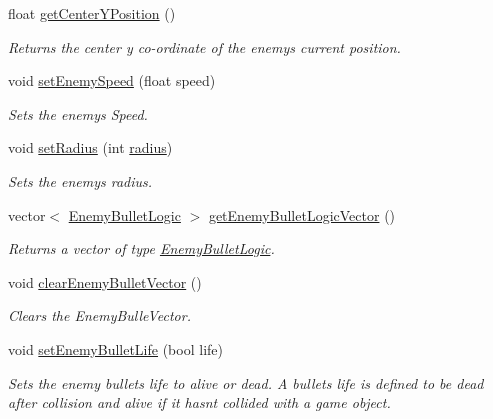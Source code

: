 \begin{DoxyCompactItemize}
float \hyperlink{class_enemy_logic_a8eb47a87a47288783e0c8963c39d24e4}{get\+Center\+Y\+Position} ()
\begin{DoxyCompactList}\small\item\em Returns the center y co-\/ordinate of the enemy\textquotesingle{}s current position. \end{DoxyCompactList}\item 
void \hyperlink{class_enemy_logic_aae66ecc1d28feaef7c814a0dff7eed95}{set\+Enemy\+Speed} (float speed)
\begin{DoxyCompactList}\small\item\em Sets the enemy\textquotesingle{}s Speed. \end{DoxyCompactList}\item 
void \hyperlink{class_enemy_logic_acabb2cb226edc71300ba1f2bc3e7a577}{set\+Radius} (int \hyperlink{_game_common_data_8h_a7a0b0f33d1d3a820325a517a0d840748}{radius})
\begin{DoxyCompactList}\small\item\em Sets the enemy\textquotesingle{}s radius. \end{DoxyCompactList}\item 
vector$<$ \hyperlink{class_enemy_bullet_logic}{Enemy\+Bullet\+Logic} $>$ \hyperlink{class_enemy_logic_ae4e49b9f854bc0407510de8e3824c7c4}{get\+Enemy\+Bullet\+Logic\+Vector} ()
\begin{DoxyCompactList}\small\item\em Returns a vector of type \hyperlink{class_enemy_bullet_logic}{Enemy\+Bullet\+Logic}. \end{DoxyCompactList}\item 
void \hyperlink{class_enemy_logic_af85aebe59b9cdee37bdab690fa496348}{clear\+Enemy\+Bullet\+Vector} ()
\begin{DoxyCompactList}\small\item\em Clears the Enemy\+Bulle\+Vector. \end{DoxyCompactList}\item 
void \hyperlink{class_enemy_logic_a88584f95e49bfd6b174b9b1d9a274cc5}{set\+Enemy\+Bullet\+Life} (bool life)
\begin{DoxyCompactList}\small\item\em Sets the enemy bullets life to alive or dead. A bullets life is defined to be dead after collision and alive if it hasnt collided with a game object. \end{DoxyCompactList}\end{DoxyCompactItemize}


